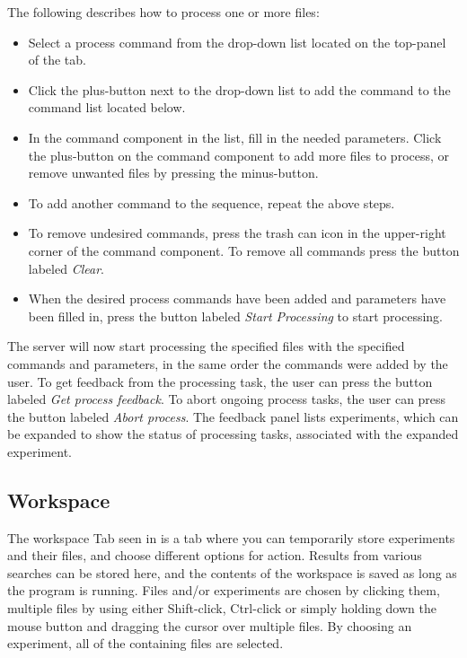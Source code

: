 The following describes how to process one or more files:
\begin{itemize}
	\item Select a process command from the drop-down list located on the top-panel of the tab.
	\item Click the plus-button next to the drop-down list to add the command to the command list located below.
	\item In the command component in the list, fill in the needed parameters. Click the plus-button on the command component to add more files to process, or remove unwanted files by pressing the minus-button.
	\item To add another command to the sequence, repeat the above steps.
	\item To remove undesired commands, press the trash can icon in the upper-right corner of the command component. To remove all commands press the button labeled \textit{Clear}.
	\item When the desired process commands have been added and parameters have been filled in, press the button labeled \textit{Start Processing} to start processing.
\end{itemize}	
	The server will now start processing the specified files with the specified commands and parameters, in the same order the commands were added by the user. To get feedback from the processing task, the user can press the button labeled \textit{Get process feedback}. To abort ongoing process tasks, the user can press the button labeled \textit{Abort process}. The feedback panel lists experiments, which can be expanded to show the status of processing tasks, associated with the expanded experiment.

\FloatBarrier

\subsection{Workspace} \label{sec:des_workspace}
The workspace Tab seen in  is a tab where you can temporarily store experiments and their files, and choose different options for action. Results from various searches can be stored here, and the contents of the workspace is saved as long as the program is running. Files and/or experiments are chosen by clicking them, multiple files by using either Shift-click, Ctrl-click or simply holding down the mouse button and dragging the cursor over multiple files. By choosing an experiment, all of the containing files are selected.
